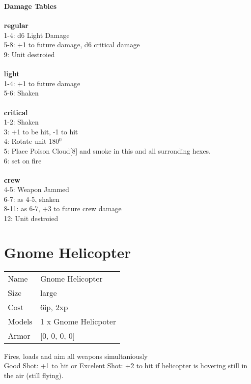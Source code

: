{\bf Damage Tables} \\
\ \\ {\bf regular } \\
1-4: d6 Light Damage \\
5-8: +1 to future damage, d6 critical damage \\
9: Unit destroied \\
\ \\ {\bf light } \\
1-4: +1 to future damage \\
5-6: Shaken \\
\ \\ {\bf critical } \\
1-2: Shaken \\
3: +1 to be hit, -1 to hit \\
4: Rotate unit 180$^0$ \\
5: Place Poison Cloud[8] and smoke in this and all surronding hexes. \\
6: set on fire \\
\ \\ {\bf crew } \\
4-5: Weapon Jammed \\
6-7: as 4-5, shaken \\
8-11: as 6-7, +3 to future crew damage \\
12: Unit destroied \\










\pagebreak\pagebreak

\section{ Gnome Helicopter }

\begin{tabular}{ll}
  Name & Gnome Helicopter \\
  Size & large\\
  Cost & 6ip, 2xp\\
  Models & 1 x Gnome Helicpoter\\
  Armor & [0, 0, 0, 0]\\
\end{tabular}

\noindent Fires, loads and aim all weapons simultaniously\\ 
Good Shot: +1 to hit or Excelent Shot: +2 to hit if helicopter is hovering still in the air (still flying).\\ 


